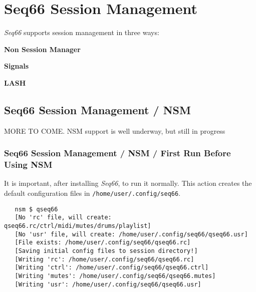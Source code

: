 %
%
%

\section{Seq66 Session Management}
\label{sec:sessions}

   \textsl{Seq66} supports session management in three ways:

   \begin{enumber}
      \item \textbf{Non Session Manager}
      \item \textbf{Signals}
      \item \textbf{LASH}
   \end{enumber}


\subsection{Seq66 Session Management / NSM}
\label{subsec:sessions_nsm}

   MORE TO COME.  NSM support is well underway, but still in progress

\subsubsection{Seq66 Session Management / NSM / First Run Before Using NSM}
\label{subsec:sessions_nsm_before_using_nsm}

   It is important, after installing \textsl{Seq66}, to run it normally. This
   action creates the default configuration files in
   \texttt{/home/user/.config/seq66}.

\begin{verbatim}
   nsm $ qseq66 
   [No 'rc' file, will create: qseq66.rc/ctrl/midi/mutes/drums/playlist]
   [No 'usr' file, will create: /home/user/.config/seq66/qseq66.usr]
   [File exists: /home/user/.config/seq66/qseq66.rc]
   [Saving initial config files to session directory!]
   [Writing 'rc': /home/user/.config/seq66/qseq66.rc]
   [Writing 'ctrl': /home/user/.config/seq66/qseq66.ctrl]
   [Writing 'mutes': /home/user/.config/seq66/qseq66.mutes]
   [Writing 'usr': /home/user/.config/seq66/qseq66.usr]
\end{verbatim}

